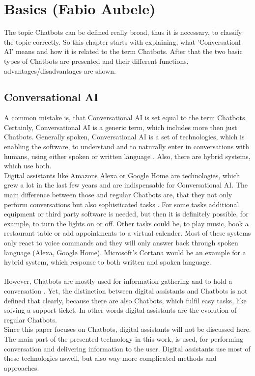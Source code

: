 \documentclass[10pt,final,journal,a4paper,oneside,twocolumn]{IEEEtran}
\begin{document}
\section{Basics (Fabio Aubele)}
The topic Chatbots can be defined really broad, thus it is necessary, to classify the topic correctly. So this chapter starts with explaining, what 'Conversationl AI' means and how it is related to the term Chatbots. After that the two basic types of Chatbots are presented and their different functions, advantages/disadvantages are shown. 

\subsection{Conversational AI}
A common mistake is, that Conversational AI is set equal to the term Chatbots. Certainly, Conversational AI is a generic term, which includes more then just Chatbots. Generally spoken, Conversational AI is a set of technologies, which is enabling the software, to understand and to naturally enter in conversations with humans, using either spoken or written language \cite{b7}. Also, there are hybrid systems, which use both.\\
Digital assistants like Amazons Alexa or Google Home are technologies, which grew a lot in the last few years and are indispensable for Conversational AI. The main difference between those and regular Chatbots are, that they not only perform conversations but also sophisticated tasks \cite{b7}. For some tasks additional equipment or third party software is needed, but then it is definitely possible, for example, to turn the lights on or off. Other tasks could be, to play music, book a restaurant table or add appointments to a virtual calender. Most of these systems only react to voice commands and they will only answer back through spoken language (Alexa, Google Home). Microsoft's Cortana would be an example for a hybrid system, which response to both written and spoken language.\\
\\
However, Chatbots are mostly used for information gathering and to hold a conversation \cite{b7}. Yet, the distinction between digital assistants and Chatbots is not defined that clearly, because there are also Chatbots, which fulfil easy tasks, like solving a support ticket. In other words digital assistants are the evolution of regular Chatbots.\\
Since this paper focuses on Chatbots, digital assistants will not be discussed here. The main part of the presented technology in this work, is used, for performing conversation and delivering information to the user. Digital assistants use most of these technologies aswell, but also way more complicated methods and approaches.
\end{document}
